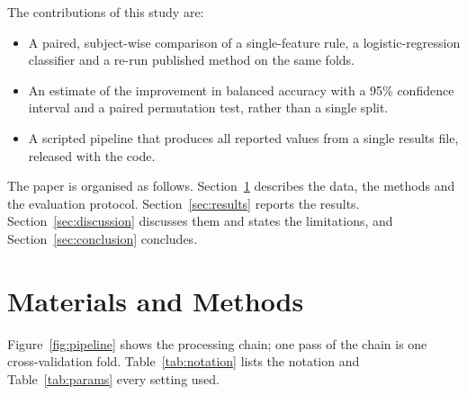 The contributions of this study are:
\begin{itemize}
  \item A paired, subject-wise comparison of a single-feature rule, a logistic-regression
        classifier and a re-run published method on the same  folds.
  \item An estimate of the improvement in balanced accuracy with a 95\% confidence interval
        and a paired permutation test, rather than a single split.
  \item A scripted pipeline that produces all reported values from a single results file,
        released with the code.
\end{itemize}

The paper is organised as follows. Section~\ref{sec:methods} describes the data, the
methods and the evaluation protocol. Section~\ref{sec:results} reports the results.
Section~\ref{sec:discussion} discusses them and states the limitations, and
Section~\ref{sec:conclusion} concludes.

\section{Materials and Methods}
\label{sec:methods}

Figure~\ref{fig:pipeline} shows the processing chain; one pass of the chain is one
cross-validation fold. Table~\ref{tab:notation} lists the notation and
Table~\ref{tab:params} every setting used.

